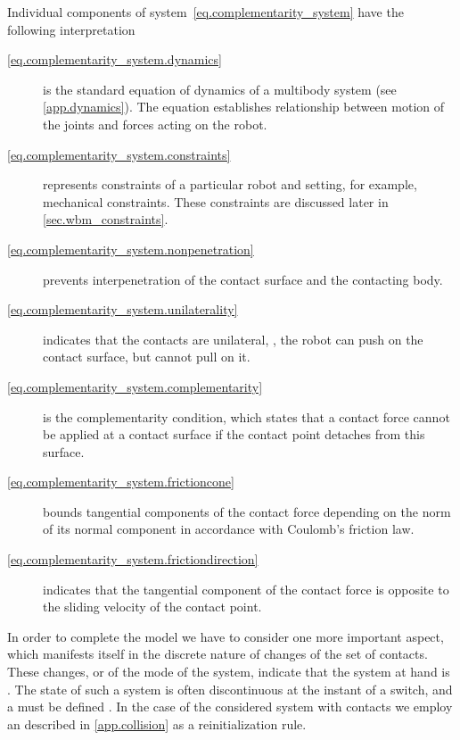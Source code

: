 Individual components of system~\cref{eq.complementarity_system} have the
following interpretation
\begin{description}
    \item[\cref{eq.complementarity_system.dynamics}] is the standard equation
        of dynamics of a multibody system (see \cref{app.dynamics}). The
        equation establishes relationship between motion of the joints and
        forces acting on the robot.

    \item[\cref{eq.complementarity_system.constraints}] represents constraints
        of a particular robot and setting, for example, mechanical constraints.
        These constraints are discussed later in \cref{sec.wbm_constraints}.

    \item[\cref{eq.complementarity_system.nonpenetration}] prevents
        interpenetration of the contact surface and the contacting body.

    \item[\cref{eq.complementarity_system.unilaterality}] indicates that the
        contacts are unilateral, \IE, the robot can push on the contact
        surface, but cannot pull on it.

    \item[\cref{eq.complementarity_system.complementarity}] is the
        complementarity condition, which states that a contact force cannot be
        applied at a contact surface if the contact point detaches from this
        surface.

    \item[\cref{eq.complementarity_system.frictioncone}] bounds tangential
        components of the contact force depending on the norm of its normal
        component in accordance with Coulomb's friction law.

    \item[\cref{eq.complementarity_system.frictiondirection}] indicates that
        the tangential component of the contact force is opposite to the
        sliding velocity of the contact point.
\end{description}


In order to complete the model we have to consider one more important aspect,
which manifests itself in the discrete nature of changes of the set of
contacts. These changes, or  of the mode of the system, indicate
that the system at hand is . The state of such a system is often
discontinuous at the instant of a switch, and a  must be defined \cite{Brogliato2003tranac}. In the case of the considered
system with contacts we employ an  described in
\cref{app.collision} as a reinitialization rule.


